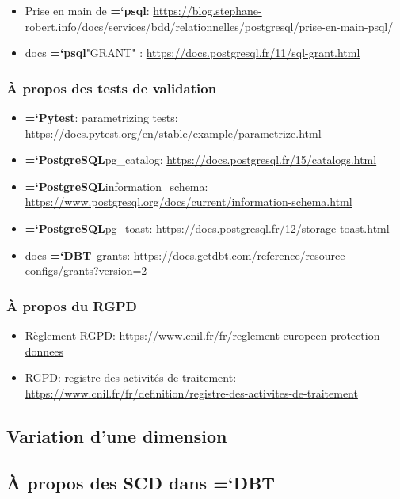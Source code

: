 \documentclass[11pt]{article}
\newcommand{\program}[1]{{\ttfamily\bfseries\hyphenchar\font=`\-\color{Maroon}#1}}
\newcommand{\techno}[1]{{\ttfamily\bfseries\hyphenchar\font=`\-\color{Sienna}#1}}
\newcommand{\postgresql}{\techno{PostgreSQL}}
\newcommand{\dbt}{\techno{DBT}}
\newcommand{\pytest}{\techno{Pytest}}
\newcommand{\psql}{\program{psql}}
\begin{document}
\begin{itemize}
    \item Prise en main de \psql : \url{https://blog.stephane-robert.info/docs/services/bdd/relationnelles/postgresql/prise-en-main-psql/}
    \item docs \psql "GRANT" : \url{https://docs.postgresql.fr/11/sql-grant.html}
\end{itemize}

\subsubsection{À propos des tests de validation} \label{ann:tests_validation_liens_utiles}

\begin{itemize}
    \item \pytest : parametrizing tests: \url{https://docs.pytest.org/en/stable/example/parametrize.html}
    \item \postgresql pg\_catalog: \url{https://docs.postgresql.fr/15/catalogs.html}
    \item \postgresql information\_schema: \url{https://www.postgresql.org/docs/current/information-schema.html}
    \item \postgresql pg\_toast: \url{https://docs.postgresql.fr/12/storage-toast.html}
    \item docs \dbt\ grants: \url{https://docs.getdbt.com/reference/resource-configs/grants?version=2}
\end{itemize}

\subsubsection{À propos du RGPD} \label{ann:rgpd_liens_utiles}

\begin{itemize}
    \item Règlement RGPD: \url{https://www.cnil.fr/fr/reglement-europeen-protection-donnees}
    \item RGPD: registre des activités de traitement: \url{https://www.cnil.fr/fr/definition/registre-des-activites-de-traitement}
\end{itemize}

\subsection{Variation d'une dimension}

\subsection{À propos des SCD dans \dbt} \label{ann:scd_dbt_liens_utiles}
\end{document}
